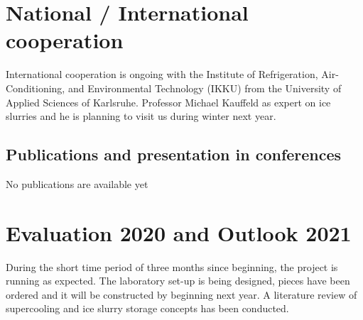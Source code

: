 \documentclass[english]{SFOEYearlyReportEnglish_2018}
\begin{document}



\section{National / International cooperation}

International cooperation is ongoing with the Institute of Refrigeration, Air-Conditioning, and Environmental Technology (IKKU) from the University of Applied Sciences of Karlsruhe. Professor Michael Kauffeld as expert on ice slurries and he is planning to visit us during winter next year.

\subsection{Publications and presentation in conferences}
\label{sec:publications}
No publications are available yet

\section{Evaluation 2020 and Outlook 2021}

During the short time period of three months since beginning, the project is running as expected. 
The laboratory set-up is being designed, pieces have been ordered and it will be constructed by beginning next year. A literature review of supercooling and ice slurry storage concepts has been conducted.


%


%

\end{document}
